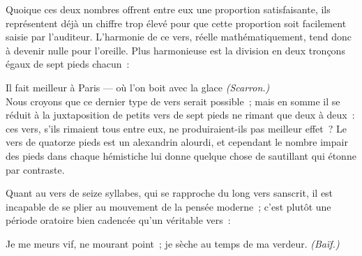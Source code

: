 \documentclass[french,twoside]{book} %
\begin{document}
\noindent Quoique ces deux nombres offrent entre eux une proportion satisfaisante, ils représentent déjà un chiffre trop  élevé pour que cette proportion soit facilement saisie par l’auditeur. L’harmonie de ce vers, réelle mathématiquement, tend donc à devenir nulle pour l’oreille. Plus harmonieuse est la division en deux tronçons égaux de sept pieds chacun :\par

Il fait meilleur à Paris — où l’on boit avec la glace \emph{(Scarron.)}\\

\noindent Nous croyons que ce dernier type de vers serait possible ; mais en somme il se réduit à la juxtaposition de petits vers de sept pieds ne rimant que deux à deux : ces vers, s’ils rimaient tous entre eux, ne produiraient-ils pas meilleur effet ? Le vers de quatorze pieds est un alexandrin alourdi, et cependant le nombre impair des pieds dans chaque hémistiche lui donne quelque chose de sautillant qui étonne par contraste.\par
Quant au vers de seize syllabes, qui se rapproche du long vers sanscrit, il est incapable de se plier au mouvement de la pensée moderne ; c’est plutôt une période oratoire bien cadencée qu’un véritable vers :\par

Je me meurs vif, ne mourant point ; je sèche au temps de ma verdeur. \emph{(Baïf.)}\\
\end{document}
